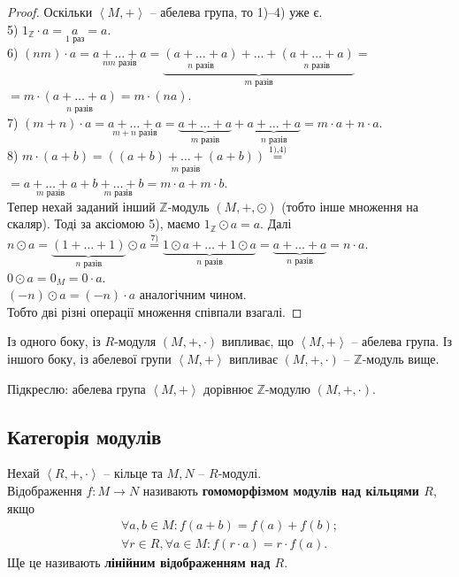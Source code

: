 \documentclass{math_library}
\begin{document}
\begin{proof}
Оскільки $\left< M,+\right>$ -- абелева група, то 1)--4) уже є.\\
5) $1_\mathbb{Z} \cdot a = \underset{1 \text{ раз}}{a} = a$.\\
6) $(nm) \cdot a = \underset{nm \text{ разів}}{a+\dots+a} = \underbrace{\underset{n\text{ разів}}{(a+\dots+a)} + \dots + \underset{n\text{ разів}}{(a+\dots+a)}}_{m \text{ разів}} =$ \\
$= m \cdot \underset{n\text{ разів}}{(a+\dots+a)} = m \cdot (na)$. \\
7) $(m+n) \cdot a = \underset{m+n\text{ разів}}{a + \dots + a} = \underbrace{a + \dots + a}_{m\text{ разів}} + \underbrace{a + \dots + a}_{n\text{ разів}} = m \cdot a + n \cdot a$. \\
8) $m \cdot (a + b) = \underset{m \text{ разів}}{((a+b) + \dots + (a+b))} \overset{\text{1),4)}}{=}$ \\
$= \underset{m\text{ разів}}{a + \dots + a} + \underset{m\text{ разів}}{b + \dots + b} = m \cdot a + m \cdot b$.
\bigskip \\
Тепер нехай заданий інший $\mathbb{Z}$-модуль $(M,+,\odot)$ (тобто інше множення на скаляр). Тоді за аксіомою 5), маємо $1_\mathbb{Z} \odot a = a$. Далі\\
$n \odot a = \underbrace{(1 + \dots + 1)}_{n \text{ разів}} \odot a \overset{7)}{=} \underbrace{1 \odot a + \dots + 1 \odot a}_{n\text{ разів}} = \underbrace{a+\dots+a}_{n \text{ разів}} = n \cdot a$.\\
$0 \odot a = 0_M = 0 \cdot a$.\\
$(-n) \odot a = (-n) \cdot a$ аналогічним чином.\\
Тобто дві різні операції множення співпали взагалі.
\end{proof}

\begin{remark}
Із одного боку, із $R$-модуля $(M,+,\cdot)$ випливає, що $\left<M,+\right>$ -- абелева група. Із іншого боку, із абелевої групи $\left<M,+\right>$ випливає $(M,+,\cdot)$ -- $\mathbb{Z}$-модуль вище.
\end{remark}

Підкреслю: абелева група $\left< M, +\right>$ дорівнює $\mathbb{Z}$-модулю $(M,+,\cdot)$.

\subsection{Категорія модулів}
\begin{definition}
Нехай $\left< R,+,\cdot\right>$ -- кільце та $M,N$ -- $R$-модулі.\\
Відображення $f \colon M \to N$ називають \textbf{гомоморфізмом модулів над кільцями $R$}, якщо
\begin{align*}
\forall a,b \in M: f(a+b) = f(a) + f(b); \\
\forall r \in R, \forall a \in M: f(r \cdot a) = r \cdot f(a).
\end{align*}
Ще це називають \textbf{лінійним відображенням над $R$}.
\end{definition}
\end{document}
